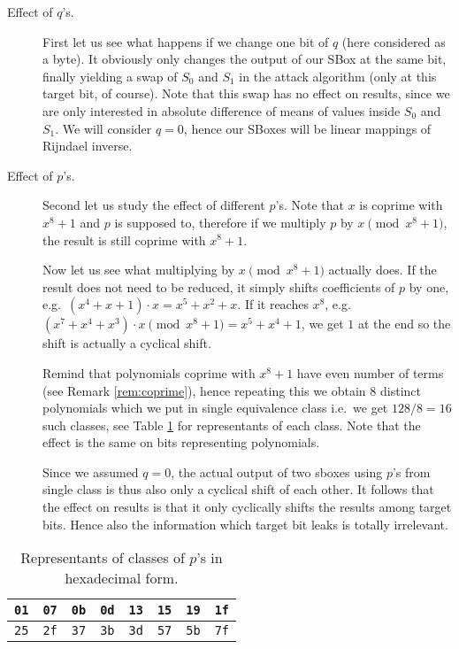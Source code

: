 \begin{description}
	\item[Effect of $q$'s.]
		First let us see what happens if we change one bit of $q$ (here considered as a byte). It obviously only changes the output of our SBox at the same bit, finally yielding a swap of $S_0$ and $S_1$ in the attack algorithm (only at this target bit, of course). Note that this swap has no effect on results, since we are only interested in absolute difference of means of values inside $S_0$ and $S_1$. We will consider $q = 0$, hence our SBoxes will be linear mappings of Rijndael inverse.
	
	\item[Effect of $p$'s.]
		Second let us study the effect of different $p$'s. Note that $x$ is coprime with $x^8+1$ and $p$ is supposed to, therefore if we multiply $p$ by $x\pmod{x^8+1}$, the result is still coprime with $x^8+1$.
		
		Now let us see what multiplying by $x\pmod{x^8+1}$ actually does. If the result does not need to be reduced, it simply shifts coefficients of $p$ by one, e.g.\ $(x^4 + x + 1) \cdot x = x^5 + x^2 + x$. If it reaches $x^8$, e.g.\ $(x^7 + x^4 + x^3) \cdot x \pmod{x^8+1} = x^5 + x^4 + 1$, we get $1$ at the end so the shift is actually a cyclical shift.
		
		Remind that polynomials coprime with $x^8+1$ have even number of terms (see Remark \ref{rem:coprime}), hence repeating this we obtain $8$ distinct polynomials which we put in single equivalence class i.e.\ we get $128/8=16$ such classes, see Table \ref{tab:classrepre} for representants of each class. Note that the effect is the same on bits representing polynomials.
		
		Since we assumed $q = 0$, the actual output of two sboxes using $p$'s from single class is thus also only a cyclical shift of each other. It follows that the effect on results is that it only cyclically shifts the results among target bits. Hence also the information which target bit leaks is totally irrelevant.
\end{description}

\begin{table}[h]
	\begin{center}
	\begin{tabular}{| c | c | c | c | c | c | c | c |}
		\hline
		{\tt 01} & {\tt 07} & {\tt 0b} & {\tt 0d} & {\tt 13} & {\tt 15} & {\tt 19} & {\tt 1f} \\
		\hline
		{\tt 25} & {\tt 2f} & {\tt 37} & {\tt 3b} & {\tt 3d} & {\tt 57} & {\tt 5b} & {\tt 7f} \\
		\hline
	\end{tabular}
	\end{center}
\caption{Representants of classes of $p$'s in hexadecimal form.}
\label{tab:classrepre}
\end{table}

